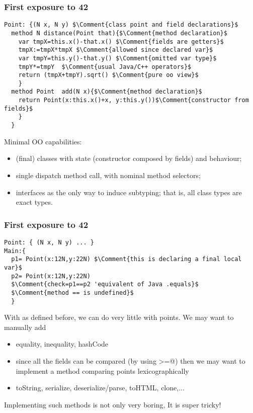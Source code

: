 \begin{frame}[fragile]
\frametitle{First exposure to 42}
\begin{NiceCode}{59ex}{0.8}
\begin{lstlisting}
Point: {(N x, N y) $\Comment{class point and field declarations}$
  method N distance(Point that){$\Comment{method declaration}$
    var tmpX=this.x()-that.x() $\Comment{fields are getters}$
    tmpX:=tmpX*tmpX $\Comment{allowed since declared var}$
    var tmpY=this.y()-that.y() $\Comment{omitted var type}$
    tmpY*=tmpY  $\Comment{usual Java/C++ operators}$
    return (tmpX+tmpY).sqrt() $\Comment{pure oo view}$
    }
  method Point  add(N x){$\Comment{method declaration}$
    return Point(x:this.x()+x, y:this.y())$\Comment{constructor from fields}$
    }
  }
\end{lstlisting}
\end{NiceCode}

Minimal OO capabilities:
\begin{itemize}
\item (final) classes with state (constructor composed by fields) and behaviour;
\item single dispatch method call, with nominal method selectors;
\item interfaces as the only way to induce subtyping; that is, all class types are exact types.
\end{itemize}

\end{frame}

\begin{frame}[fragile]
\frametitle{First exposure to 42}
\begin{NiceCode}{59ex}{0.8}
\begin{lstlisting}
Point: { (N x, N y) ... }
Main:{
  p1= Point(x:12N,y:22N) $\Comment{this is declaring a final local var}$
  p2= Point(x:12N,y:22N)
  $\Comment{check=p1==p2 'equivalent of Java .equals}$
  $\Comment{method == is undefined}$
  }
\end{lstlisting}
\end{NiceCode}

With \Q@Point@ as defined before, we can do very little with points.
We may want to manually add
\begin{itemize}
\item equality, inequality, hashCode
\item since all the fields can be compared  (by using \Q@>=@) then
we may want to implement a method comparing points lexicographically
\item toString, serialize, deserialize/parse, toHTML, clone,...
\end{itemize}
Implementing such methods is not only very boring,
\PresentationOnly\pause\alert{It is super tricky!}

\end{frame}

